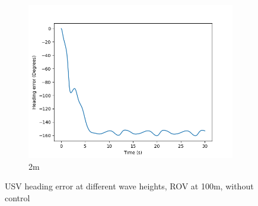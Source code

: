 \documentclass[class=article, crop=false]{standalone}
\begin{document}
\begin{figure}
\begin{subfigure}[b]{0.48\textwidth}
        \includegraphics{scenario1/rov-100m/2.0m/usv_heading_error_uncontrolled}
        \caption{2m}
        \label{}
    \end{subfigure}

    \caption{USV heading error at different wave heights, ROV at 100m, without control}
\end{figure}
\FloatBarrier
\end{document}
